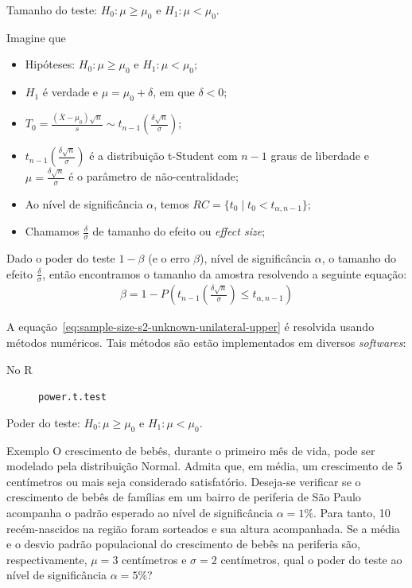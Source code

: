 \documentclass[8pt]{beamer}
\begin{document}
\begin{frame}{Tamanho do teste: $H_0:\mu \geq \mu_0$ e $H_1: \mu < \mu_0$.}

\normalsize

Imagine que
\begin{itemize}
	\item Hipóteses: $H_0: \mu \geq \mu_0$ e $H_1: \mu < \mu_0$;
	\item $H_1$ é verdade e $\mu = \mu_0 + \delta$, em que $\delta < 0$;
	\item $T_0 = \frac{(\bar{X} - \mu_0)\sqrt{n}}{s}  \sim t_{n-1}\left( \frac{\delta \sqrt{n}}{\sigma} \right)$;
	\item $t_{n-1}\left(\frac{\delta\sqrt{n}}{\sigma}\right)$ é a distribuição t-Student com $n-1$ graus de liberdade e $\mu=\frac{\delta \sqrt{n}}{\sigma}$ é o parâmetro de não-centralidade;
	\item Ao nível de significância $\alpha$, temos $RC = \{ t_0 \mid t_0 < t_{\alpha, n-1}   \}$;
	\item Chamamos $\frac{\delta}{\sigma}$ de tamanho do efeito ou \textit{effect size};
\end{itemize}
\vfill

Dado o poder do teste $1-\beta$ (e o erro $\beta$), nível de significância $\alpha$, o tamanho do efeito $\frac{\delta}{\sigma}$, então encontramos o tamanho da amostra resolvendo a seguinte equação:
\begin{align}\label{eq:sample-size-s2-unknown-unilateral-upper}
\beta = 1- P\left( t_{n-1}\left( \frac{\delta\sqrt{n}}{\sigma}\right) \leq t_{\alpha, n-1}  \right)
\end{align}

A equação~\eqref{eq:sample-size-s2-unknown-unilateral-upper} é resolvida usando métodos numéricos. Tais métodos são estão implementados em diversos \textit{softwares}:
\begin{description}
	\item[No R] \texttt{power.t.test}
\end{description}

\normalsize

\end{frame}

\begin{frame}{Poder do teste: $H_0:\mu \geq \mu_0$ e $H_1: \mu < \mu_0$.}

\large
\begin{block}{Exemplo}
	O crescimento de bebês, durante o primeiro mês de vida, pode ser modelado pela distribuição Normal. Admita que, em média, um crescimento de 5 centímetros ou mais seja considerado satisfatório. Deseja-se verificar se o crescimento de bebês de famílias em um bairro de periferia de São Paulo acompanha o padrão esperado ao nível de significância $\alpha=1\%$. Para tanto, 10 recém-nascidos na região foram sorteados e sua altura acompanhada. Se a média e o desvio padrão populacional do crescimento de bebês na periferia são, respectivamente, $\mu=3$ centímetros e $\sigma=2$ centímetros, qual o poder do teste ao nível de significância $\alpha=5\%$?
\end{block}
\normalsize

\end{frame}
\end{document}

